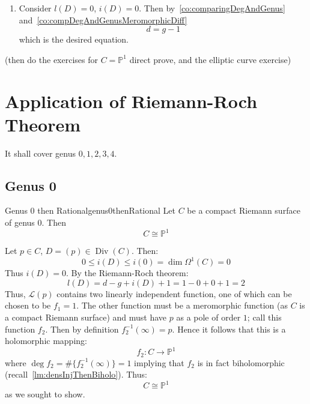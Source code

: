\documentclass{book}
\renewcommand{\P}{{\mathbb{P}}}
\newcommand{\CL}{{\mathcal{L}}}
\newcommand{\Div}{{\operatorname{Div}}}
\begin{document}
\begin{Proof}
\begin{enumerate}
       that $(\omega) = D+E$ where $E \ge 0$. Then by~\cref{pr:brill-noetherReciprocity}
       \[
        l(E) = i(D) \ne 0 \qquad i(E) = l(D) = 0
       \]
       Thus, by case (1) applied to $E$ we get:
       \[
        l(E) = \deg E - g + i(E) + 1
       \]
       Note that
       \[
        \deg E = \deg(\omega) - \deg D = 2g-2-d
       \]
       Then substituting and rewriting $l(E)$, $i(E)$ as $i(D)$ and $l(D)$, we get the equality.
     \item Consider $l(D) = 0$, $i(D) = 0$. Then by~\cref{co:comparingDegAndGenus}
       and~\cref{co:compDegAndGenusMeromorphicDiff}
       \[
        d = g-1
       \]
       which is the desired equation.
  \end{enumerate}
\end{Proof}

(then do the exercises for $C = \P^1$ direct prove, and the elliptic curve exercise)

\section{Application of Riemann-Roch Theorem}\label{sec:applicationRiemannRoch}

It shall cover genus $0,1,2,3,4$.

\subsection{Genus 0}

\begin{prop}{Genus 0 then Rational}{genus0thenRational}
  Let $C$ be a compact Riemann surface of genus $0$. Then
  \[
    C \cong \P^1
  \]
\end{prop}

\begin{Proof}
  Let $p \in C$, $D = (p) \in \Div(C)$. Then:
  \[
    0 \le i(D) \le i(0) = \dim \Omega^1(C) = 0
  \]
  Thus $i(D) = 0$. By the Riemann-Roch theorem:
  \[
    l(D) = d-g+i(D) + 1 = 1-0+0+1 = 2
  \]
  Thus, $\CL(p)$ contains two linearly independent function, one of which can be chosen to be $f_1 = 1$. The
  other function must be a meromorphic function (as $C$ is a compact Riemann surface) and must have $p$ as
  a pole of order $1$; call this function $f_2$. Then by definition $f_2^{-1}(\infty) = p$. Hence it follows
  that this is a holomorphic mapping:
  \[
    f_2: C \to \P^1
  \]
  where $\deg f_2 = \#\{f_2^{-1}(\infty)\} = 1$ implying that $f_2$ is in fact biholomorphic
  (recall~\cref{lm:densInjThenBiholo}). Thus:
  \[
    C \cong \P^1
  \]
  as we sought to show.
\end{Proof}
\end{document}
